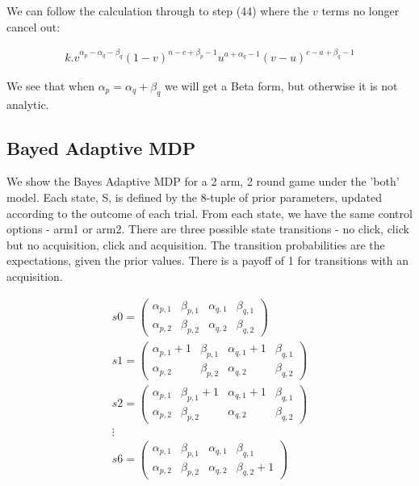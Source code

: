 \documentclass[11pt,a4,singlespacing,titlepagenumber=on]{scrreprt}
\numberwithin{equation}{chapter} %
\theoremstyle{remark}
\begin{document}
We can follow the calculation through to step (44) where the $v$ terms no longer cancel out:

\begin{align}
 k . v^{\alpha_p - \alpha_q - \beta_q}(1-v)^{n-c+\beta_p-1} u^{a+\alpha_q-1} (v - u)^{c-a+\beta_q-1}
\end{align}

We see that when $ \alpha_p = \alpha_q + \beta_q $ we will get a Beta form, but otherwise it is not analytic. 

\subsection{Bayed Adaptive MDP}

We show the Bayes Adaptive MDP for a 2 arm, 2 round game under the 'both' model. Each state, S, is defined by the 8-tuple of prior parameters, updated according to the outcome of each trial. From each state, we have the same control options - arm1 or arm2. There are three possible state transitions - no click, click but no acquisition, click and acquisition. The transition probabilities are the expectations, given the prior values. There is a payoff of 1 for transitions with an acquisition.

\begin{align}
s0 =
 \begin{pmatrix}
  \alpha_{p,1} & \beta_{p,1} & \alpha_{q,1} & \beta_{q,1} \\
  \alpha_{p,2} & \beta_{p,2} & \alpha_{q,2} & \beta_{q,2} 
 \end{pmatrix} \\
s1 =
  \begin{pmatrix}
   \alpha_{p,1}+1 & \beta_{p,1} & \alpha_{q,1}+1 & \beta_{q,1} \\
   \alpha_{p,2} & \beta_{p,2} & \alpha_{q,2} & \beta_{q,2} 
  \end{pmatrix} \\
s2 =
  \begin{pmatrix}
   \alpha_{p,1} & \beta_{p,1}+1 & \alpha_{q,1}+1 & \beta_{q,1} \\
   \alpha_{p,2} & \beta_{p,2} & \alpha_{q,2} & \beta_{q,2} 
  \end{pmatrix} \\
\vdots \\
s6 =
  \begin{pmatrix}
   \alpha_{p,1} & \beta_{p,1} & \alpha_{q,1} & \beta_{q,1} \\
   \alpha_{p,2} & \beta_{p,2} & \alpha_{q,2} & \beta_{q,2}+1 
  \end{pmatrix}
\end{align} 
\end{document}
